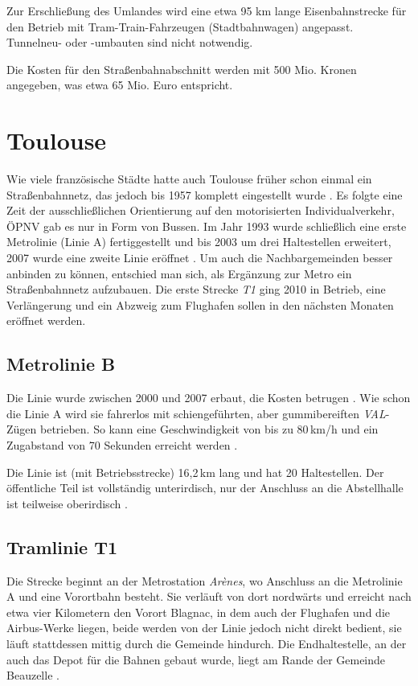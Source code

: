 Zur Erschließung des Umlandes wird eine etwa 95 km lange Eisenbahnstrecke für
den Betrieb mit Tram-Train-Fahrzeugen (Stadtbahnwagen) angepasst. Tunnelneu-
oder -umbauten sind nicht notwendig.

Die Kosten für den Straßenbahnabschnitt werden mit 500 Mio. Kronen angegeben,
was etwa 65 Mio.  Euro entspricht.

\section{Toulouse}

Wie viele französische Städte hatte auch Toulouse früher schon einmal ein Straßenbahnnetz, das jedoch bis 1957 komplett eingestellt wurde \cite{tlsesv}.
Es folgte eine Zeit der ausschließlichen Orientierung auf den motorisierten Individualverkehr, ÖPNV gab es nur in Form von Bussen.
Im Jahr 1993 wurde schließlich eine erste Metrolinie (Linie A) fertiggestellt und bis 2003 um drei Haltestellen erweitert, 2007 wurde eine zweite Linie eröffnet \cite{lafage}.
Um auch die Nachbargemeinden besser anbinden zu können, entschied man sich, als Ergänzung zur Metro ein Straßenbahnnetz aufzubauen. Die erste Strecke \textit{T1} ging 2010 in Betrieb, eine Verlängerung und ein Abzweig zum Flughafen sollen in den nächsten Monaten eröffnet werden.

\subsection*{Metrolinie B}

Die Linie wurde zwischen 2000 und 2007 erbaut, die Kosten betrugen .
Wie schon die Linie A wird sie fahrerlos mit schiengeführten, aber gummibereiften \textit{VAL}-Zügen betrieben. So kann eine Geschwindigkeit von bis zu 80\,km/h und ein Zugabstand von 70 Sekunden erreicht werden \cite{lafage}.

Die Linie ist (mit Betriebsstrecke) 16,2\,km lang und hat 20 Haltestellen. Der öffentliche Teil ist vollständig unterirdisch, nur der Anschluss an die Abstellhalle ist teilweise oberirdisch \cite{lafage}.

\subsection*{Tramlinie T1}

Die Strecke beginnt an der Metrostation \textit{Arènes}, wo Anschluss an die Metrolinie A und eine Vorortbahn besteht. Sie verläuft von dort nordwärts und erreicht nach etwa vier Kilometern den Vorort Blagnac, in dem auch der Flughafen und die Airbus-Werke liegen, beide werden von der Linie jedoch nicht direkt bedient, sie läuft stattdessen mittig durch die Gemeinde hindurch. Die Endhaltestelle, an der auch das Depot für die Bahnen gebaut wurde, liegt am Rande der Gemeinde Beauzelle \cite{lafage}.

